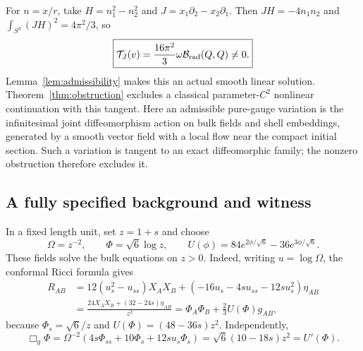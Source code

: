 \documentclass[11pt]{article}
\theoremstyle{remark}
\begin{document}
For $n=x/r$, take $H=n_1^2-n_2^2$ and
$J=x_1\partial_2-x_2\partial_1$. Then
$JH=-4n_1n_2$ and $\int_{S^3}(JH)^2=4\pi^2/3$, so
\begin{equation}
 \boxed{\mathcal T_J(v)=\frac{16\pi^2}{3}
                  \omega\mathcal B_{\rm rad}(Q,Q)\ne0.}
 \label{eq:explicit-obstruction}
\end{equation}
Lemma~\ref{lem:admissibility} makes this an actual smooth linear solution.
Theorem~\ref{thm:obstruction} excludes a classical parameter-$C^2$ nonlinear
continuation with this tangent. Here an admissible pure-gauge variation is
the infinitesimal joint diffeomorphism action on bulk fields and shell
embeddings, generated by a smooth vector field with a local flow near the
compact initial section. Such a variation is tangent to an exact
diffeomorphic family; the nonzero obstruction therefore excludes it.

\subsection{A fully specified background and witness}
\label{sec:explicit-background}

In a fixed length unit, set $z=1+s$ and choose
\begin{equation}
 \Omega=z^{-2},\qquad \Phi=\sqrt6\log z,\qquad
 U(\phi)=84e^{2\phi/\sqrt6}-36e^{3\phi/\sqrt6}.
 \label{eq:explicit-background}
\end{equation}
These fields solve the bulk equations on $z>0$. Indeed, writing
$u=\log\Omega$, the conformal Ricci formula gives
\begin{align}
 R_{AB}
 &=12(u_s^2-u_{ss})X_AX_B
   +(-16u_s-4su_{ss}-12su_s^2)\eta_{AB}\nonumber\\
 &=\frac{24X_AX_B+(32-24s)\eta_{AB}}{z^2}
  =\Phi_A\Phi_B+\frac23 U(\Phi)g_{AB},
 \label{eq:explicit-ricci}
\end{align}
because $\Phi_s=\sqrt6/z$ and $U(\Phi)=(48-36s)z^2$.
Independently,
\begin{equation}
 \Box_g\Phi=\Omega^{-2}(4s\Phi_{ss}+10\Phi_s+12su_s\Phi_s)
 =\sqrt6(10-18s)z^2=U'(\Phi).
 \label{eq:explicit-scalar}
\end{equation}
\end{document}
